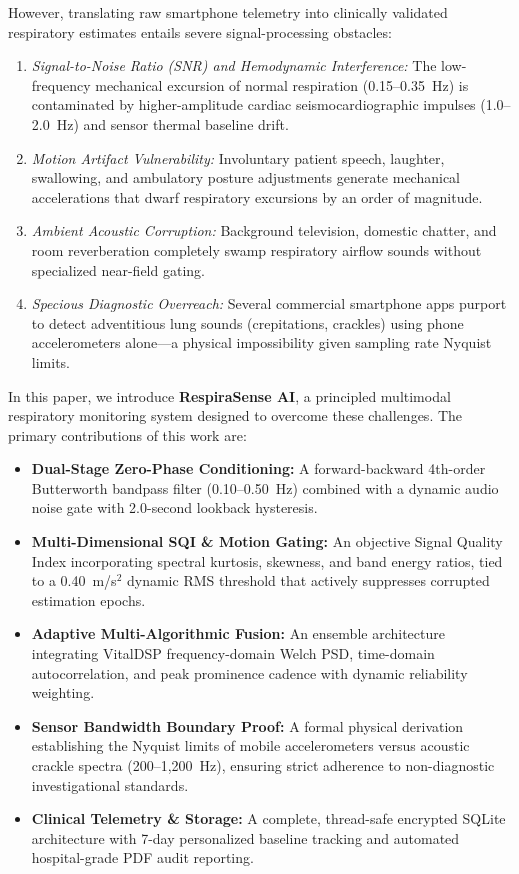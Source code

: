 \documentclass[journal]{IEEEtran}
\begin{document}
However, translating raw smartphone telemetry into clinically validated respiratory estimates entails severe signal-processing obstacles:
\begin{enumerate}
    \item \textit{Signal-to-Noise Ratio (SNR) and Hemodynamic Interference:} The low-frequency mechanical excursion of normal respiration (0.15--0.35~Hz) is contaminated by higher-amplitude cardiac seismocardiographic impulses (1.0--2.0~Hz) and sensor thermal baseline drift.
    \item \textit{Motion Artifact Vulnerability:} Involuntary patient speech, laughter, swallowing, and ambulatory posture adjustments generate mechanical accelerations that dwarf respiratory excursions by an order of magnitude.
    \item \textit{Ambient Acoustic Corruption:} Background television, domestic chatter, and room reverberation completely swamp respiratory airflow sounds without specialized near-field gating.
    \item \textit{Specious Diagnostic Overreach:} Several commercial smartphone apps purport to detect adventitious lung sounds (crepitations, crackles) using phone accelerometers alone—a physical impossibility given sampling rate Nyquist limits.
\end{enumerate}

In this paper, we introduce \textbf{RespiraSense AI}, a principled multimodal respiratory monitoring system designed to overcome these challenges. The primary contributions of this work are:
\begin{itemize}
    \item \textbf{Dual-Stage Zero-Phase Conditioning:} A forward-backward 4th-order Butterworth bandpass filter (0.10--0.50~Hz) combined with a dynamic audio noise gate with 2.0-second lookback hysteresis.
    \item \textbf{Multi-Dimensional SQI \& Motion Gating:} An objective Signal Quality Index incorporating spectral kurtosis, skewness, and band energy ratios, tied to a 0.40~m/s$^2$ dynamic RMS threshold that actively suppresses corrupted estimation epochs.
    \item \textbf{Adaptive Multi-Algorithmic Fusion:} An ensemble architecture integrating VitalDSP frequency-domain Welch PSD, time-domain autocorrelation, and peak prominence cadence with dynamic reliability weighting.
    \item \textbf{Sensor Bandwidth Boundary Proof:} A formal physical derivation establishing the Nyquist limits of mobile accelerometers versus acoustic crackle spectra (200--1,200~Hz), ensuring strict adherence to non-diagnostic investigational standards.
    \item \textbf{Clinical Telemetry \& Storage:} A complete, thread-safe encrypted SQLite architecture with 7-day personalized baseline tracking and automated hospital-grade PDF audit reporting.
\end{itemize}
\end{document}
